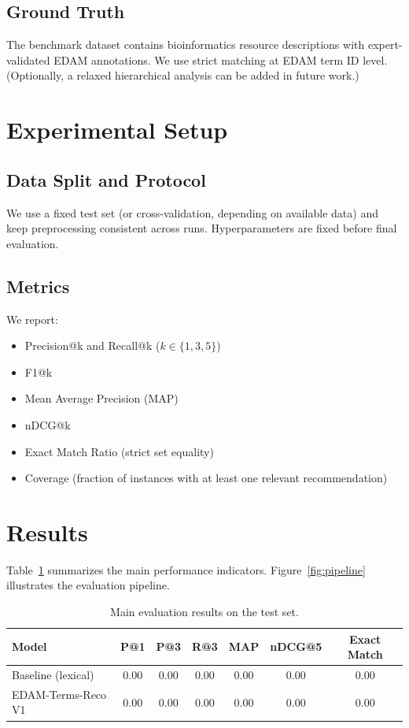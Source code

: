 \documentclass[10pt]{article}
\begin{document}
\subsection{Ground Truth}
The benchmark dataset contains bioinformatics resource descriptions with expert-validated EDAM annotations.
We use strict matching at EDAM term ID level.
(Optionally, a relaxed hierarchical analysis can be added in future work.)

\section{Experimental Setup}
\subsection{Data Split and Protocol}
We use a fixed test set (or cross-validation, depending on available data) and keep preprocessing consistent across runs.
Hyperparameters are fixed before final evaluation.

\subsection{Metrics}
We report:
\begin{itemize}[leftmargin=*]
    \item Precision@k and Recall@k (\(k \in \{1,3,5\}\))
    \item F1@k
    \item Mean Average Precision (MAP)
    \item nDCG@k
    \item Exact Match Ratio (strict set equality)
    \item Coverage (fraction of instances with at least one relevant recommendation)
\end{itemize}

\section{Results}
Table~\ref{tab:main-results} summarizes the main performance indicators.
Figure~\ref{fig:pipeline} illustrates the evaluation pipeline.

\begin{table}[h]
\centering
\caption{Main evaluation results on the test set.}
\label{tab:main-results}
\begin{tabular}{lcccccc}
\toprule
Model & P@1 & P@3 & R@3 & MAP & nDCG@5 & Exact Match \\
\midrule
Baseline (lexical) & 0.00 & 0.00 & 0.00 & 0.00 & 0.00 & 0.00 \\
EDAM-Terms-Reco V1 & 0.00 & 0.00 & 0.00 & 0.00 & 0.00 & 0.00 \\
\bottomrule
\end{tabular}
\end{table}
\end{document}
